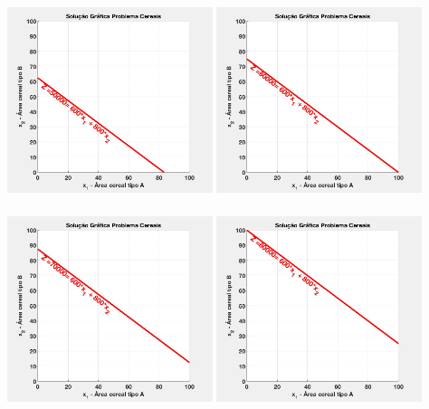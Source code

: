 \documentclass{beamer}
\begin{document}
\begin{frame}
\begin{columns}
\begin{column}{0.5\textwidth}
			\only<2> {\includegraphics[width=6cm,height=6cm]{MatLab/anima_2.png} }
			\only<3> {\includegraphics[width=6cm,height=6cm]{MatLab/anima_3.png} }
			\only<4> {\includegraphics[width=6cm,height=6cm]{MatLab/anima_4.png} }
			\only<5> {\includegraphics[width=6cm,height=6cm]{MatLab/anima_5.png} }

\end{column}
\end{columns}
\end{frame}
\end{document}
